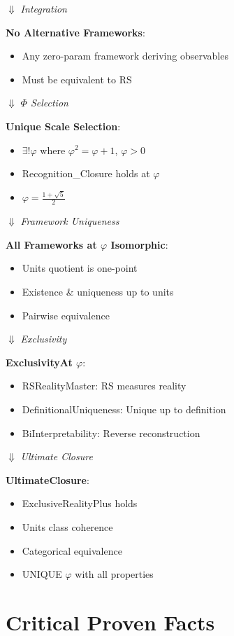 \documentclass[11pt]{article}
\theoremstyle{definition}
\theoremstyle{remark}
\begin{document}
$\Downarrow$ \textit{Integration}

\textbf{No Alternative Frameworks}:
\begin{itemize}
\item Any zero-param framework deriving observables
\item Must be equivalent to RS
\end{itemize}

$\Downarrow$ \textit{$\Phi$ Selection}

\textbf{Unique Scale Selection}:
\begin{itemize}
\item $\exists! \varphi$ where $\varphi^2 = \varphi + 1$, $\varphi > 0$
\item Recognition\_Closure holds at $\varphi$
\item $\varphi = \frac{1+\sqrt{5}}{2}$
\end{itemize}

$\Downarrow$ \textit{Framework Uniqueness}

\textbf{All Frameworks at $\varphi$ Isomorphic}:
\begin{itemize}
\item Units quotient is one-point
\item Existence \& uniqueness up to units
\item Pairwise equivalence
\end{itemize}

$\Downarrow$ \textit{Exclusivity}

\textbf{ExclusivityAt $\varphi$}:
\begin{itemize}
\item RSRealityMaster: RS measures reality
\item DefinitionalUniqueness: Unique up to definition
\item BiInterpretability: Reverse reconstruction
\end{itemize}

$\Downarrow$ \textit{Ultimate Closure}

\textbf{UltimateClosure}:
\begin{itemize}
\item ExclusiveRealityPlus holds
\item Units class coherence
\item Categorical equivalence
\item UNIQUE $\varphi$ with all properties
\end{itemize}

\section{Critical Proven Facts}
\end{document}
